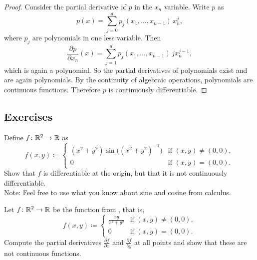 \begin{proof}
Consider the partial derivative of $p$ in the $x_n$ variable.
Write $p$ as
\begin{equation*}
p(x) = \sum_{j=0}^d p_j(x_1,\ldots,x_{n-1}) \, x_n^j ,
\end{equation*}
where $p_j$ are polynomials in one less variable.
Then
\begin{equation*}
\frac{\partial p}{\partial x_n}(x)
= \sum_{j=1}^d p_j(x_1,\ldots,x_{n-1}) \, j x_n^{j-1} ,
\end{equation*}
which is again a polynomial.
So the partial derivatives of polynomials exist and are again polynomials.
By the continuity of algebraic operations, polynomials are continuous functions.
Therefore $p$ is continuously differentiable.
\end{proof}

\subsection{Exercises}

\begin{exercise}
Define $f \colon {\mathbb{R}}^2 \to {\mathbb{R}}$ as
\begin{equation*}
f(x,y) \coloneqq
\begin{cases}
(x^2+y^2)\sin\bigl({(x^2+y^2)}^{-1}\bigr) & \text{if } (x,y) \neq (0,0), \\
0                                         & \text{if } (x,y) = (0,0).
\end{cases}
\end{equation*}
Show that $f$ is differentiable at the origin, but that it is not 
continuously differentiable.
\\
Note: Feel free to use what you know about sine and cosine from calculus.
\end{exercise}

\begin{exercise}
Let $f \colon {\mathbb{R}}^2 \to {\mathbb{R}}$ be the function from
, that is,
\begin{equation*}
f(x,y)
\coloneqq
\begin{cases}
\frac{xy}{x^2+y^2} & \text{if } (x,y) \neq (0,0), \\
0                  & \text{if } (x,y) = (0,0).
\end{cases}
\end{equation*}
Compute the partial derivatives 
$\frac{\partial f}{\partial x}$ and
$\frac{\partial f}{\partial y}$ at all points and show that these are not
continuous functions.
\end{exercise}

